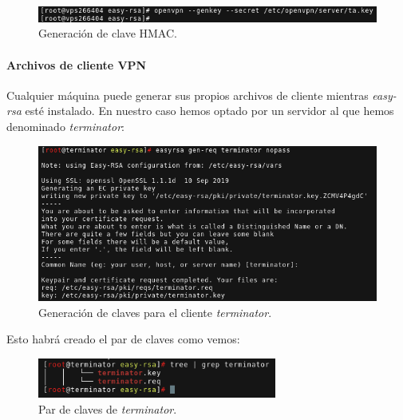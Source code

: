 \documentclass[a4paper, 11pt, titlepage]{article}
\begin{document}
            \begin{figure}[htp]
                \centering
                \includegraphics[width=1\textwidth]{resources/ca12.png}
                \caption{Generación de clave HMAC.}
                \label{ca12}
            \end{figure}
        
            \paragraph{Archivos de cliente VPN}
        
            Cualquier máquina puede generar sus propios archivos de cliente mientras \textit{easy-rsa} esté
            instalado. En nuestro caso hemos optado por un servidor al que hemos denominado \textit{terminator}:
        
            \begin{figure}[htp]
                \centering
                \includegraphics[width=1\textwidth]{resources/ca13.png}
                \caption{Generación de claves para el cliente \textit{terminator}.}
                \label{ca13}
            \end{figure}
        
            Esto habrá creado el par de claves como vemos:
        
            \begin{figure}[htp]
                \centering
                \includegraphics[width=0.7\textwidth]{resources/ca14.png}
                \caption{Par de claves de \textit{terminator}.}
                \label{ca14}
            \end{figure}
        
\end{document}
